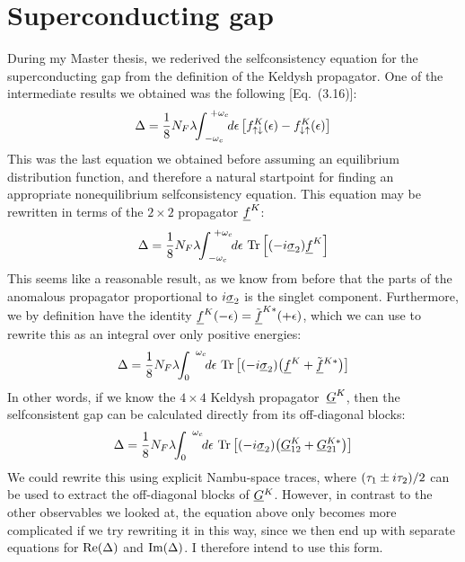 \section{Superconducting gap}
During my Master thesis, we rederived the selfconsistency equation for the superconducting gap from the definition of the Keldysh propagator.
One of the intermediate results we obtained was the following [Eq.~(3.16)]:
\begin{equation}
  \Delta = \frac{1}{8} N_F \lambda \!\!\int_{\;-\omega_c}^{\;+\omega_c} \!\!\d\epsilon\, \big[ f^K_{\up\dn}(\epsilon) - f^K_{\dn\up}(\epsilon) \big]
\end{equation}
This was the last equation we obtained before assuming an equilibrium distribution function, and therefore a natural startpoint for finding an appropriate nonequilibrium selfconsistency equation.
This equation may be rewritten in terms of the $2\times2$ propagator $\U{f}^K$:
\begin{equation}
  \Delta = \frac{1}{8} N_F \lambda \!\!\int_{\;-\omega_c}^{\;+\omega_c} \!\!\d\epsilon\, \tr\left[ (-i\S{2})\U{f}^K \right]
\end{equation}
This seems like a reasonable result, as we know from before that the parts of the anomalous propagator proportional to $i\S{2}$ is the singlet component.
Furthermore, we by definition have the identity $\U{f}^K(-\epsilon) = \TU{f}^{K*}(+\epsilon)$, which we can use to rewrite this as an integral over only positive energies:
\begin{equation}
  \Delta = \frac{1}{8} N_F \lambda \!\!\int_{0}^{\;\;\omega_c} \!\!\d\epsilon\, \tr\left[ (-i\S{2})\big(\U{f}{}^K + \TU{f}{}^{K*}\big)\right]
\end{equation}
In other words, if we know the $4\times4$ Keldysh propagator~$\U{G}^K$, then the selfconsistent gap can be calculated directly from its off-diagonal blocks:
\begin{equation}
  \Delta = \frac{1}{8} N_F \lambda \!\!\int_{0}^{\;\;\omega_c} \!\!\d\epsilon\, \tr\left[ (-i\S{2})\big(\U{G}{}^K_{12} + \U{G}{}^{K*}_{21}\big)\right]
\end{equation}
We could rewrite this using explicit Nambu-space traces, where $(\N{1} \pm i\N{2})/2$ can be used to extract the off-diagonal blocks of $\U{G}{}^K$.
However, in contrast to the other observables we looked at, the equation above only becomes more complicated if we try rewriting it in this way, since we then end up with separate equations for $\re(\Delta)$ and $\im(\Delta)$.
I therefore intend to use this form.



